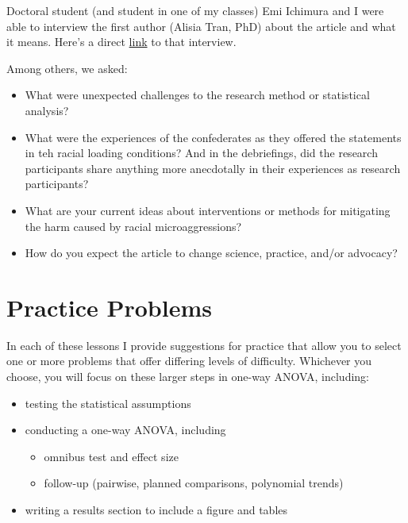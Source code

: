\documentclass[
  11pt,
]{book}
\providecommand{\tightlist}{%
  \setlength{\itemsep}{0pt}\setlength{\parskip}{0pt}}
\begin{document}
Doctoral student (and student in one of my classes) Emi Ichimura and I were able to interview the first author (Alisia Tran, PhD) about the article and what it means. Here's a direct \href{https://spu.hosted.panopto.com/Panopto/Pages/Viewer.aspx?id=643f8a1e-bb6d-4ceb-a860-aeba01522528}{link} to that interview.

Among others, we asked:

\begin{itemize}
\tightlist
\item
  What were unexpected challenges to the research method or statistical analysis?
\item
  What were the experiences of the confederates as they offered the statements in teh racial loading conditions? And in the debriefings, did the research participants share anything more anecdotally in their experiences as research participants?
\item
  What are your current ideas about interventions or methods for mitigating the harm caused by racial microaggressions?
\item
  How do you expect the article to change science, practice, and/or advocacy?
\end{itemize}

\hypertarget{practice-problems-4}{%
\section{Practice Problems}\label{practice-problems-4}}

In each of these lessons I provide suggestions for practice that allow you to select one or more problems that offer differing levels of difficulty. Whichever you choose, you will focus on these larger steps in one-way ANOVA, including:

\begin{itemize}
\tightlist
\item
  testing the statistical assumptions
\item
  conducting a one-way ANOVA, including

  \begin{itemize}
  \tightlist
  \item
    omnibus test and effect size
  \item
    follow-up (pairwise, planned comparisons, polynomial trends)
  \end{itemize}
\item
  writing a results section to include a figure and tables
\end{itemize}
\end{document}
